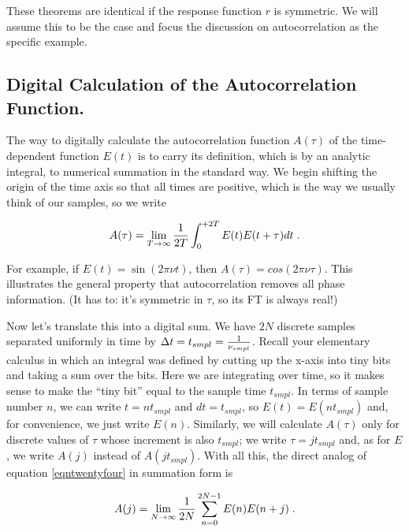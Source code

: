 \documentclass[preprint]{aastex}
\begin{document}
	These theorems are identical if the response function $r$ is
symmetric. We will assume this to be the case and focus the discussion
on autocorrelation as the specific example.

\subsection{Digital Calculation of the Autocorrelation Function.} 

\label{elevenpone}

	The way to digitally calculate the autocorrelation function
$A(\tau)$ of the time-dependent function $E(t)$ is to carry its
definition, which is by an analytic integral, to numerical summation in
the standard way.  We begin shifting the origin of the time axis so that
all times are positive, which is the way we usually think of our
samples, so we write

\begin{equation} \label{eqntwentyfour}
A(\tau) = \lim_{T \to \infty} {1 \over 2T}
\int_0^{+2T} E(t) E(t + \tau) dt \; .
\end{equation}

\noindent For example, if $E(t) = \sin( 2 \pi \nu t)$, then $A(\tau) =
cos(2 \pi \nu \tau)$. This illustrates the general property that
autocorrelation removes all phase information. (It has to: it's
symmetric in $\tau$, so its FT is always real!)

        Now let's translate this into a digital sum.  We have $2N$
discrete samples separated uniformly in time by $\Delta t = t_{smpl} = 
{1 \over \nu_{smpl}}$.  Recall your elementary calculus in which an    
integral was defined by cutting up the x-axis into tiny bits and taking
a sum over the bits.  Here we are integrating over time, so it makes   
sense to make the ``tiny bit'' equal to the sample time $t_{smpl}$.  In
terms of sample number $n$, we can write $t = nt_{smpl}$ and $dt =
t_{smpl}$, so $E(t) = E(nt_{smpl})$ and, for convenience, we just write 
$E(n)$.  Similarly, we will calculate $A(\tau)$ only for discrete values
of $\tau$ whose increment is also $t_{smpl}$; we write $\tau = j
t_{smpl}$ and, as for $E$, we write $A(j)$ instead of $A(jt_{smpl})$.
With all this, the direct analog of equation \ref{eqntwentyfour} in
summation form is

\begin{equation}
A(j) = \lim_{N \to \infty} {1 \over 2N}
\sum_{n=0}^{2N-1} E(n) E(n + j) \; .
\end{equation}
\end{document}

